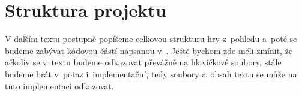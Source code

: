 
\section{Struktura projektu}

V dalším textu postupně popíšeme celkovou strukturu hry z~pohledu \UEu{} a~poté se budeme zabývat kódovou částí napsanou v~\CPP{}. Ještě bychom zde měli zmínit, že ačkoliv se v~textu budeme odkazovat převážně na hlavičkové soubory, stále budeme brát v~potaz i~implementační, tedy  soubory a~obsah textu se může na tuto implementaci odkazovat.


